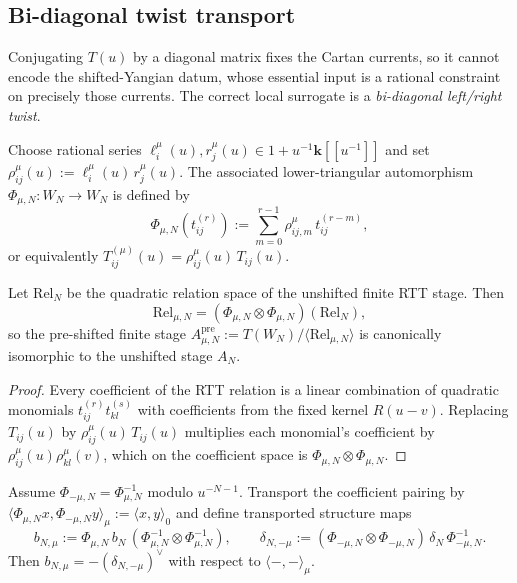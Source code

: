 \subsection{Bi-diagonal twist transport}
\label{subsec:bi-diagonal-twist-transport}

\begin{remark}
\label{rem:shifted-rtt-diagonal-conjugation}
Conjugating $T(u)$ by a diagonal matrix fixes the Cartan currents, so
it cannot encode the shifted-Yangian datum, whose essential input is a
rational constraint on precisely those currents. The correct local
surrogate is a \emph{bi-diagonal left/right twist}.
\end{remark}

Choose rational series
$\ell_i^\mu(u), r_j^\mu(u) \in 1 + u^{-1}\mathbf{k}[[u^{-1}]]$
and set $\rho_{ij}^\mu(u) := \ell_i^\mu(u)\,r_j^\mu(u)$. The
associated lower-triangular automorphism
$\Phi_{\mu,N} \colon W_N \to W_N$
is defined by
\[
\Phi_{\mu,N}(t_{ij}^{(r)})
:= \sum_{m=0}^{r-1} \rho_{ij,m}^\mu \, t_{ij}^{(r-m)},
\]
or equivalently $T_{ij}^{(\mu)}(u) = \rho_{ij}^\mu(u)\,T_{ij}(u)$.

\begin{theorem}
\label{thm:shifted-rtt-twist-transport}
Let $\mathrm{Rel}_N$ be the quadratic relation space of the
unshifted finite RTT stage. Then
\[
\mathrm{Rel}_{\mu,N}
= (\Phi_{\mu,N} \otimes \Phi_{\mu,N})(\mathrm{Rel}_N),
\]
so the pre-shifted finite stage
$A_{\mu,N}^{\mathrm{pre}} := T(W_N)/\langle
\mathrm{Rel}_{\mu,N}\rangle$
is canonically isomorphic to the unshifted stage $A_N$.
\end{theorem}

\begin{proof}
Every coefficient of the RTT relation is a linear combination of
quadratic monomials $t_{ij}^{(r)}t_{kl}^{(s)}$ with coefficients
from the fixed kernel $R(u-v)$. Replacing $T_{ij}(u)$ by
$\rho_{ij}^\mu(u)\,T_{ij}(u)$ multiplies each monomial's coefficient
by $\rho_{ij}^\mu(u)\rho_{kl}^\mu(v)$, which on the coefficient space
is $\Phi_{\mu,N} \otimes \Phi_{\mu,N}$.
\end{proof}

\begin{theorem}
\label{thm:shifted-rtt-shifted-bar-adjointness}
Assume $\Phi_{-\mu,N} = \Phi_{\mu,N}^{-1}$ modulo
$u^{-N-1}$. Transport the coefficient pairing by
$\langle \Phi_{\mu,N}x, \Phi_{-\mu,N}y \rangle_\mu
:= \langle x, y \rangle_0$
and define transported structure maps
\[
b_{N,\mu} := \Phi_{\mu,N}\,b_N\,
(\Phi_{\mu,N}^{-1} \otimes \Phi_{\mu,N}^{-1}),
\qquad
\delta_{N,-\mu} := (\Phi_{-\mu,N} \otimes \Phi_{-\mu,N})\,
\delta_N\,\Phi_{-\mu,N}^{-1}.
\]
Then $b_{N,\mu} = -(\delta_{N,-\mu})^\vee$ with respect to
$\langle{-},{-}\rangle_\mu$.
\end{theorem}

